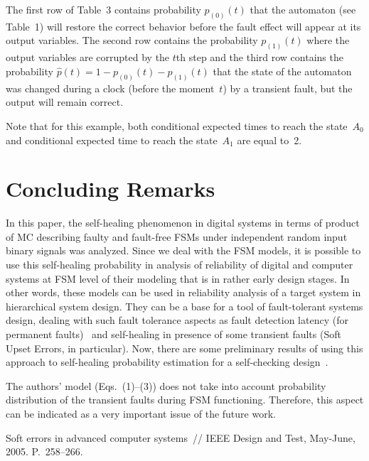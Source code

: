\begin{multicols}{2}
The  first row of Table~3 contains  probability
$p_{(0)}(t)$ that the automaton (see Table~1) will restore the
correct behavior before the fault effect will appear
at its output variables.
The second row contains the probability $p_{(1)}(t)$
where the output variables are corrupted by the
$t$th step and the third row contains the probability
$\hat p(t)=1-p_{(0)}(t)-p_{(1)}(t)$
that the state of the automaton was changed during a clock
(before the moment~$t$) by a transient fault,
but the output will remain correct.
{

}


Note that for this example, both conditional expected times to reach the state~$A_0$
and conditional expected time to reach the state~$A_1$  are equal to~2.

\section{Concluding Remarks}

\noindent
In this paper, the self-healing phenomenon in
digital systems in terms of product of MC
describing faulty and fault-free FSMs under independent
random input binary signals was  analyzed.
Since we deal with the FSM models, it is possible to use
this self-healing probability in analysis of  reliability
of digital and computer systems at FSM level of their
modeling that is in rather early design stages. In other words,
these models can be used in  reliability analysis of a
target system in hierarchical system design.
They can be a base for a tool of fault-tolerant
systems design, dealing with such fault tolerance aspects
as fault detection latency (for permanent faults)~\cite{8fr}
and self-healing in presence of some transient faults
(Soft Upset Errors, in particular).
Now, there are some preliminary results of using this
approach to self-healing probability estimation for a
self-checking design~\cite{6fr}.
{

}


The authors' model (Eqs.~(1)--(3)) does not take into account probability
distribution of the transient faults during FSM functioning.
Therefore, this aspect can be indicated as a very important issue
of the future work.

{\small\frenchspacing
{%
\begin{thebibliography}{99}

Soft errors in advanced computer systems~//
IEEE Design and Test, May-June, 2005. P.~258--266.


\end{thebibliography}}}
\end{multicols}
